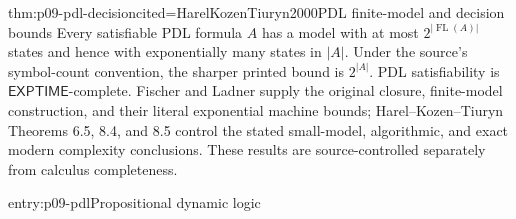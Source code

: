 \begin{hbtheorem}{thm:p09-pdl-decision}{cited=HarelKozenTiuryn2000}{PDL finite-model and decision bounds}
Every satisfiable PDL formula \(A\) has a model with at most
\(2^{|\operatorname{FL}(A)|}\) states and hence with exponentially many states
in \(|A|\).  Under the source's symbol-count convention, the sharper printed
bound is \(2^{|A|}\).  PDL satisfiability is
\(\mathsf{EXPTIME}\)-complete.  Fischer and Ladner supply the original closure,
finite-model construction, and their literal exponential machine bounds;
Harel--Kozen--Tiuryn Theorems 6.5, 8.4, and 8.5 control the stated small-model,
algorithmic, and exact modern complexity conclusions.  These results are
source-controlled separately from calculus completeness.
\end{hbtheorem}

\begin{systementry}{entry:p09-pdl}{Propositional dynamic logic}
\end{systementry}

